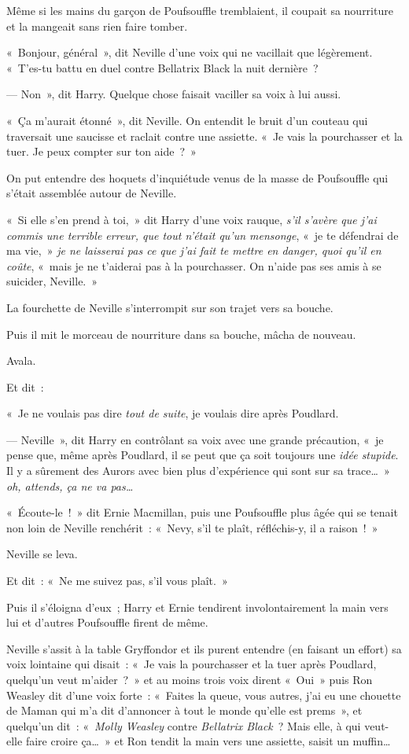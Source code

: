 Même si les mains du garçon de Poufsouffle tremblaient, il coupait sa nourriture et la mangeait sans rien faire tomber.

«~Bonjour, général~», dit Neville d'une voix qui ne vacillait que légèrement. «~T'es-tu battu en duel contre Bellatrix Black la nuit dernière~?

--- Non~», dit Harry. Quelque chose faisait vaciller sa voix à lui aussi.

«~Ça m'aurait étonné~», dit Neville. On entendit le bruit d'un couteau qui traversait une saucisse et raclait contre une assiette. «~Je vais la pourchasser et la tuer. Je peux compter sur ton aide~?~»

On put entendre des hoquets d'inquiétude venus de la masse de Poufsouffle qui s'était assemblée autour de Neville.

«~Si elle s'en prend à toi,~» dit Harry d'une voix rauque, \emph{s'il s'avère que j'ai commis une terrible erreur, que tout n'était qu'un mensonge}, «~je te défendrai de ma vie,~» \emph{je ne laisserai pas ce que j'ai fait te mettre en danger, quoi qu'il en coûte}, «~mais je ne t'aiderai pas à la pourchasser. On n'aide pas ses amis à se suicider, Neville.~»

La fourchette de Neville s'interrompit sur son trajet vers sa bouche.

Puis il mit le morceau de nourriture dans sa bouche, mâcha de nouveau.

Avala.

Et dit~:

«~Je ne voulais pas dire \emph{tout de suite}, je voulais dire après Poudlard.

--- Neville~», dit Harry en contrôlant sa voix avec une grande précaution, «~je pense que, même après Poudlard, il se peut que ça soit toujours une \emph{idée stupide}. Il y a sûrement des Aurors avec bien plus d'expérience qui sont sur sa trace…~» \emph{oh, attends, ça ne va pas…}

«~Écoute-le~!~» dit Ernie Macmillan, puis une Poufsouffle plus âgée qui se tenait non loin de Neville renchérit~: «~Nevy, s'il te plaît, réfléchis-y, il a raison~!~»

Neville se leva.

Et dit~: «~Ne me suivez pas, s'il vous plaît.~»

Puis il s'éloigna d'eux~; Harry et Ernie tendirent involontairement la main vers lui et d'autres Poufsouffle firent de même.

Neville s'assit à la table Gryffondor et ils purent entendre (en faisant un effort) sa voix lointaine qui disait~: «~Je vais la pourchasser et la tuer après Poudlard, quelqu'un veut m'aider~?~» et au moins trois voix dirent «~Oui~» puis Ron Weasley dit d'une voix forte~: «~Faites la queue, vous autres, j'ai eu une chouette de Maman qui m'a dit d'annoncer à tout le monde qu'elle est prems~», et quelqu'un dit~: «~\emph{Molly Weasley} contre \emph{Bellatrix Black}~? Mais elle, à qui veut-elle faire croire ça…~» et Ron tendit la main vers une assiette, saisit un muffin…

